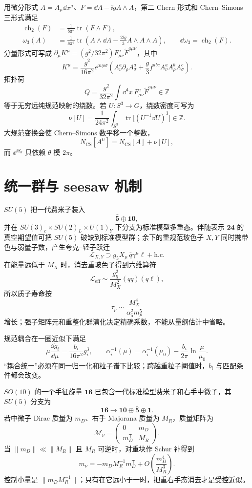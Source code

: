 用微分形式 $A=A_\mu\dd x^\mu$、$F=\dd A-\ii gA\wedge A$，第二 Chern 形式和 Chern--Simons 三形式满足
\begin{align*}
\operatorname{ch}_2(F)&=\frac{1}{8\pi^2}\operatorname{tr}(F\wedge F),\\
\omega_3(A)&=\frac{1}{8\pi^2}\operatorname{tr}\!\left(A\wedge\dd A-
\frac{2\ii g}{3}A\wedge A\wedge A\right),
\qquad \dd\omega_3=\operatorname{ch}_2(F).
\end{align*}
分量形式可写成 $\partial_\mu K^\mu=(g^2/32\pi^2)F^a_{\mu\nu}\widetilde F^{a\mu\nu}$，其中
\[
K^\mu=\frac{g^2}{16\pi^2}\epsilon^{\mu\nu\rho\sigma}
\left(A_\nu^a\partial_\rho A_\sigma^a+
\frac{g}{3}f^{abc}A_\nu^aA_\rho^bA_\sigma^c\right).
\]
拓扑荷
\[
Q=\frac{g^2}{32\pi^2}\int\dd^4x\,
F^a_{\mu\nu}\widetilde F^{a\mu\nu}\in\mathbb Z
\]
等于无穷远纯规范映射的绕数。若 $U:S^3\to G$，绕数密度可写为
\[
\nu[U]=\frac{1}{24\pi^2}\int_{S^3}
\operatorname{tr}\bigl[(U^{-1}\dd U)^3\bigr]\in\mathbb Z.
\]
大规范变换会使 Chern--Simons 数平移一个整数，
\[
N_{\mathrm{CS}}[A^U]=N_{\mathrm{CS}}[A]+\nu[U],
\]
而 $\ee^{\ii S_\theta}$ 只依赖 $\theta$ 模 $2\pi$。

\section{统一群与 seesaw 机制}

$SU(5)$ 把一代费米子装入
\[
\bar{\mathbf5}\oplus\mathbf{10},
\]
并在 $SU(3)_c\times SU(2)_L\times U(1)_Y$ 下分支为标准模型多重态。伴随表示 $\mathbf{24}$ 的真空期望值可把 $SU(5)$ 破缺到标准模型群；余下的重规范玻色子 $X,Y$ 同时携带色与弱量子数，产生夸克--轻子跃迁
\[
\mathcal L_{X,Y}\supset g_5X_\mu\,\bar q\gamma^\mu\ell+\mathrm{h.c.}
\]
在能量远低于 $M_X$ 时，消去重玻色子得到六维算符
\[
\mathcal L_{\mathrm{eff}}\sim\frac{g_5^2}{M_X^2}(qq)(q\ell),
\]
所以质子寿命按
\[
\tau_p\sim\frac{M_X^4}{\alpha_5^2m_p^5}
\]
增长；强子矩阵元和重整化群演化决定精确系数，不能从量纲估计中省略。

规范耦合在一圈近似下满足
\[
\mu\frac{\dd g_i}{\dd\mu}=\frac{b_i}{16\pi^2}g_i^3,
\qquad
\alpha_i^{-1}(\mu)=\alpha_i^{-1}(\mu_0)-\frac{b_i}{2\pi}\ln\frac{\mu}{\mu_0}.
\]
“耦合统一”必须在同一归一化和粒子谱下比较；跨越重粒子阈值时，$b_i$ 与匹配条件都会改变。

$SO(10)$ 的一个手征旋量 $\mathbf{16}$ 已包含一代标准模型费米子和右手中微子，其 $SU(5)$ 分支为
\[
\mathbf{16}\longrightarrow\mathbf{10}\oplus\bar{\mathbf5}\oplus\mathbf1.
\]
若中微子 Dirac 质量为 $m_D$、右手 Majorana 质量为 $M_R$，质量矩阵为
\[
\mathcal M_\nu=
\begin{pmatrix}0&m_D\\m_D^{\mathsf T}&M_R\end{pmatrix}.
\]
当 $\|m_D\|\ll\|M_R\|$ 且 $M_R$ 可逆时，对重块作 Schur 补得到
\begin{equation}
m_\nu=-m_DM_R^{-1}m_D^{\mathsf T}
+O\!\left(\frac{m_D^4}{M_R^3}\right).
\label{eq:seesaw-mass}
\end{equation}
控制小量是 $\|m_DM_R^{-1}\|$；只有在它远小于一时，把重右手态消去才是受控近似。

